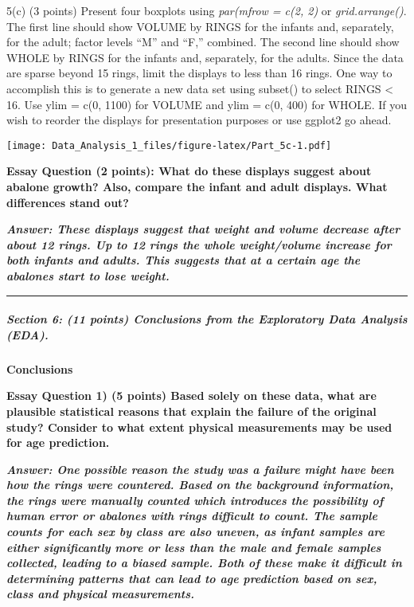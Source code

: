 \documentclass[
]{article}
\begin{document}
5(c) (3 points) Present four boxplots using \emph{par(mfrow = c(2, 2)}
or \emph{grid.arrange()}. The first line should show VOLUME by RINGS for
the infants and, separately, for the adult; factor levels ``M'' and
``F,'' combined. The second line should show WHOLE by RINGS for the
infants and, separately, for the adults. Since the data are sparse
beyond 15 rings, limit the displays to less than 16 rings. One way to
accomplish this is to generate a new data set using subset() to select
RINGS \textless{} 16. Use ylim = c(0, 1100) for VOLUME and ylim = c(0,
400) for WHOLE. If you wish to reorder the displays for presentation
purposes or use ggplot2 go ahead.

\texttt{[image: Data\_Analysis\_1\_files/figure-latex/Part\_5c-1.pdf]}

\textbf{Essay Question (2 points): What do these displays suggest about
abalone growth? Also, compare the infant and adult displays. What
differences stand out?}

\textbf{\emph{Answer: These displays suggest that weight and volume
decrease after about 12 rings. Up to 12 rings the whole weight/volume
increase for both infants and adults. This suggests that at a certain
age the abalones start to lose weight. }}

\begin{center}\rule{0.5\linewidth}{0.5pt}\end{center}

\hypertarget{section-6-11-points-conclusions-from-the-exploratory-data-analysis-eda.}{%
\subparagraph{Section 6: (11 points) Conclusions from the Exploratory
Data Analysis
(EDA).}\label{section-6-11-points-conclusions-from-the-exploratory-data-analysis-eda.}}

\textbf{Conclusions}

\textbf{Essay Question 1) (5 points) Based solely on these data, what
are plausible statistical reasons that explain the failure of the
original study? Consider to what extent physical measurements may be
used for age prediction.}

\textbf{\emph{Answer: One possible reason the study was a failure might
have been how the rings were countered. Based on the background
information, the rings were manually counted which introduces the
possibility of human error or abalones with rings difficult to count.
The sample counts for each sex by class are also uneven, as infant
samples are either significantly more or less than the male and female
samples collected, leading to a biased sample. Both of these make it
difficult in determining patterns that can lead to age prediction based
on sex, class and physical measurements.}}
\end{document}
